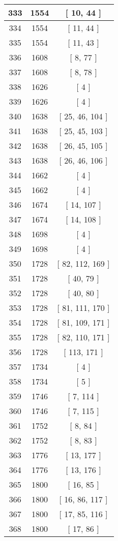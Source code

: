 \begin{center}
\begin{longtable}[H]{|| c c c ||}
333 & 1554 & [ 10, 44 ]
\\\hline
334 & 1554 & [ 11, 44 ]
\\\hline
335 & 1554 & [ 11, 43 ]
\\\hline
336 & 1608 & [ 8, 77 ]
\\\hline
337 & 1608 & [ 8, 78 ]
\\\hline
338 & 1626 & [ 4 ]
\\\hline
339 & 1626 & [ 4 ]
\\\hline
340 & 1638 & [ 25, 46, 104 ]
\\\hline
341 & 1638 & [ 25, 45, 103 ]
\\\hline
342 & 1638 & [ 26, 45, 105 ]
\\\hline
343 & 1638 & [ 26, 46, 106 ]
\\\hline
344 & 1662 & [ 4 ]
\\\hline
345 & 1662 & [ 4 ]
\\\hline
346 & 1674 & [ 14, 107 ]
\\\hline
347 & 1674 & [ 14, 108 ]
\\\hline
348 & 1698 & [ 4 ]
\\\hline
349 & 1698 & [ 4 ]
\\\hline
350 & 1728 & [ 82, 112, 169 ]
\\\hline
351 & 1728 & [ 40, 79 ]
\\\hline
352 & 1728 & [ 40, 80 ]
\\\hline
353 & 1728 & [ 81, 111, 170 ]
\\\hline
354 & 1728 & [ 81, 109, 171 ]
\\\hline
355 & 1728 & [ 82, 110, 171 ]
\\\hline
356 & 1728 & [ 113, 171 ]
\\\hline
357 & 1734 & [ 4 ]
\\\hline
358 & 1734 & [ 5 ]
\\\hline
359 & 1746 & [ 7, 114 ]
\\\hline
360 & 1746 & [ 7, 115 ]
\\\hline
361 & 1752 & [ 8, 84 ]
\\\hline
362 & 1752 & [ 8, 83 ]
\\\hline
363 & 1776 & [ 13, 177 ]
\\\hline
364 & 1776 & [ 13, 176 ]
\\\hline
365 & 1800 & [ 16, 85 ]
\\\hline
366 & 1800 & [ 16, 86, 117 ]
\\\hline
367 & 1800 & [ 17, 85, 116 ]
\\\hline
368 & 1800 & [ 17, 86 ]
\\\hline

\end{longtable}
\end{center}
